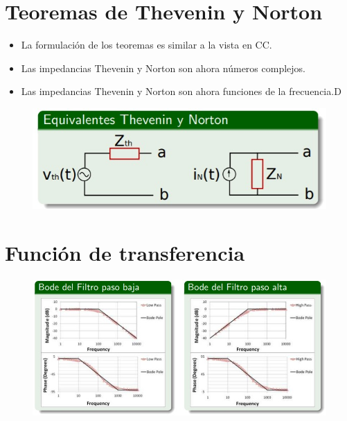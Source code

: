 \documentclass[10pt,a4paper]{article}
\begin{document}
	\section{Teoremas de Thevenin y Norton}
	
	\begin{itemize}
		\item La formulación de los teoremas es similar a la vista en CC.
		\item Las impedancias Thevenin y Norton son ahora números complejos.
		\item Las impedancias Thevenin y Norton son ahora funciones de la frecuencia.D
	\end{itemize}
	
	\begin{figure}[h]
		\centering
		\includegraphics[scale = 0.4]{equivalentes}
	\end{figure}

	\section{Función de transferencia}
	
	\begin{figure}[h]
		\centering
		\includegraphics[scale = 0.5]{filtros}
	\end{figure}
	
	
	
\end{document}
